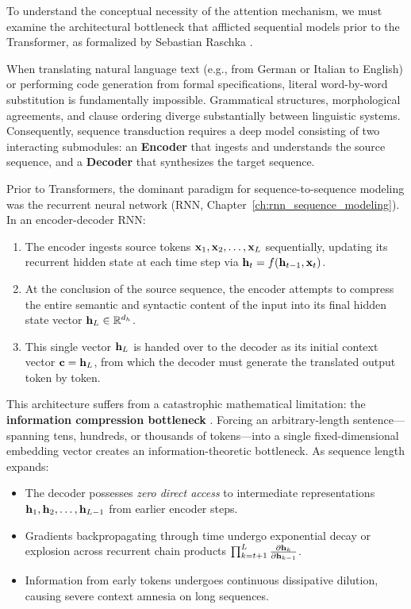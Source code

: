 \documentclass[../../main.tex]{subfiles}
\begin{document}
To understand the conceptual necessity of the attention mechanism, we must examine the architectural bottleneck that afflicted sequential models prior to the Transformer, as formalized by Sebastian Raschka \cite{raschka2024llm}.

When translating natural language text (e.g., from German or Italian to English) or performing code generation from formal specifications, literal word-by-word substitution is fundamentally impossible. Grammatical structures, morphological agreements, and clause ordering diverge substantially between linguistic systems. Consequently, sequence transduction requires a deep model consisting of two interacting submodules: an \textbf{Encoder} that ingests and understands the source sequence, and a \textbf{Decoder} that synthesizes the target sequence.

Prior to Transformers, the dominant paradigm for sequence-to-sequence modeling was the recurrent neural network (RNN, Chapter~\ref{ch:rnn_sequence_modeling}). In an encoder-decoder RNN:
\begin{enumerate}
    \item The encoder ingests source tokens $\mathbf{x}_1, \mathbf{x}_2, \dots, \mathbf{x}_L$ sequentially, updating its recurrent hidden state at each time step via $\mathbf{h}_t = f(\mathbf{h}_{t-1}, \mathbf{x}_t)$.
    \item At the conclusion of the source sequence, the encoder attempts to compress the entire semantic and syntactic content of the input into its final hidden state vector $\mathbf{h}_L \in \mathbb{R}^{d_h}$.
    \item This single vector $\mathbf{h}_L$ is handed over to the decoder as its initial context vector $\mathbf{c} = \mathbf{h}_L$, from which the decoder must generate the translated output token by token.
\end{enumerate}

This architecture suffers from a catastrophic mathematical limitation: the \textbf{information compression bottleneck} \cite{raschka2024llm}. Forcing an arbitrary-length sentence—spanning tens, hundreds, or thousands of tokens—into a single fixed-dimensional embedding vector creates an information-theoretic bottleneck. As sequence length expands:
\begin{itemize}
    \item The decoder possesses \emph{zero direct access} to intermediate representations $\mathbf{h}_1, \mathbf{h}_2, \dots, \mathbf{h}_{L-1}$ from earlier encoder steps.
    \item Gradients backpropagating through time undergo exponential decay or explosion across recurrent chain products $\prod_{k=t+1}^L \frac{\partial \mathbf{h}_k}{\partial \mathbf{h}_{k-1}}$.
    \item Information from early tokens undergoes continuous dissipative dilution, causing severe context amnesia on long sequences.
\end{itemize}
\end{document}
